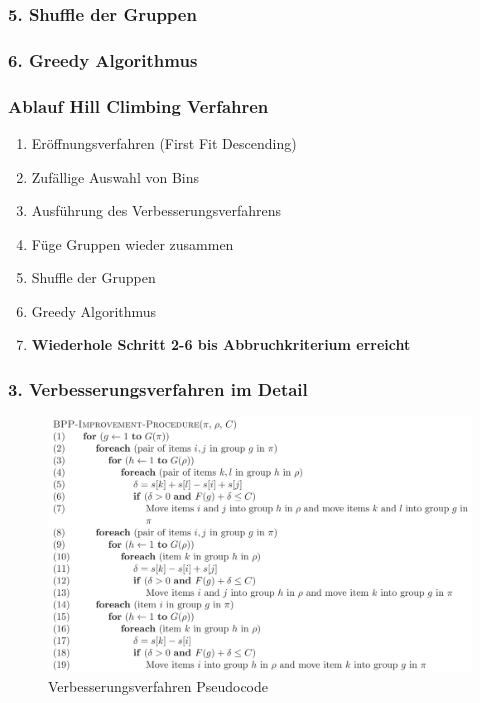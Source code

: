 \documentclass{beamer}
\begin{document}
\begin{frame}
\frametitle{5. Shuffle der Gruppen}


\end{frame}
\begin{frame}
\frametitle{6. Greedy Algorithmus}


\end{frame}
\begin{frame}
\frametitle{Ablauf Hill Climbing Verfahren}
\begin{footnotesize}
\begin{enumerate}
\item Eröffnungsverfahren (First Fit Descending)
\item Zufällige Auswahl von Bins 
\item Ausführung des Verbesserungsverfahrens
\item Füge Gruppen wieder zusammen
\item Shuffle der Gruppen
\item Greedy Algorithmus
\item \textbf{Wiederhole Schritt 2-6 bis Abbruchkriterium erreicht}
\end{enumerate}
\end{footnotesize}
\end{frame}
\begin{frame}
\frametitle{3. Verbesserungsverfahren im Detail}
\begin{figure}[!htbp]
\begin{center}
\includegraphics[scale=0.25]{img/improvement.png}
\end{center}
\caption{Verbesserungsverfahren Pseudocode}
\label{fig:architecture}
\end{figure}

\end{frame}
\end{document}
